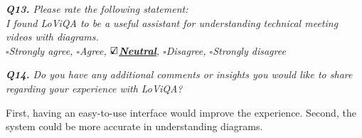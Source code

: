 \vspace*{1em}\noindent\textit{\textbf{Q13.} Please rate the following statement:
\\[.5em]
\textit{I found LoViQA to be a useful assistant for understanding technical meeting videos with diagrams.}
\\[.5em]
\indent $\square$Strongly agree,
$\square$Agree,
\underline{\bfseries$\text{\rlap{$\checkmark$}}\square$Neutral},
$\square$Disagree,
$\square$Strongly disagree
}

\vspace*{1em}

\noindent\textit{\textbf{Q14.} Do you have any additional comments or insights you would like to share regarding your experience with LoViQA?
}

\begin{samepage}
\begin{mdframed}[style=MyFrame]
First, having an easy-to-use interface would improve the experience. Second, the system could be more accurate in understanding diagrams.
\end{mdframed}
\end{samepage}

